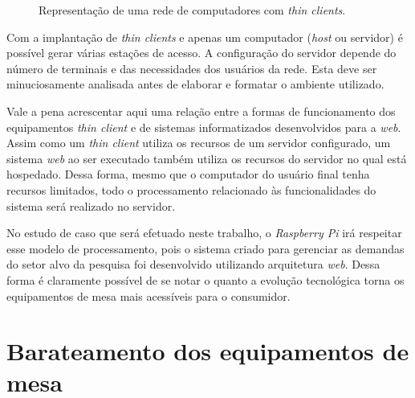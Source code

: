 \begin{figure}[ht]
    \centering
    \caption{Representação de uma rede de computadores com \textit{thin clients}.}
\end{figure}

Com a implantação de \textit{thin clients} e apenas um computador (\textit{host} ou servidor) é possível gerar várias estações de acesso. A configuração do servidor depende do número de terminais e das necessidades dos usuários da rede. Esta deve ser minuciosamente analisada antes de elaborar e formatar o ambiente utilizado.

Vale a pena acrescentar aqui uma relação entre a formas de funcionamento dos equipamentos \textit{thin client} e de sistemas informatizados desenvolvidos para a \textit{web}. Assim como um \textit{thin client} utiliza os recursos de um servidor configurado, um sistema \textit{web} ao ser executado também utiliza os recursos do servidor no qual está hospedado. Dessa forma, mesmo que o computador do usuário final tenha recursos limitados, todo o processamento relacionado às funcionalidades do sistema será realizado no servidor.

No estudo de caso que será efetuado neste trabalho, o \textit{Raspberry Pi} irá respeitar esse modelo de processamento, pois o sistema criado para gerenciar as demandas do setor alvo da pesquisa foi desenvolvido utilizando arquitetura \textit{web}. Dessa forma é claramente possível de se notar o quanto a evolução tecnológica torna os equipamentos de mesa mais acessíveis para o consumidor.

\section{Barateamento dos equipamentos de mesa}


